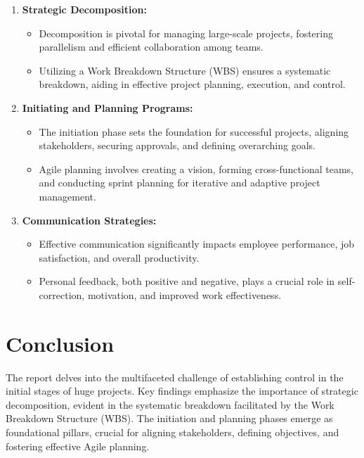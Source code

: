 \documentclass[runningheads]{llncs}
\begin{document}
\begin{enumerate}
    \item \textbf{Strategic Decomposition:}
        \begin{itemize}[label=$\bullet$]
            \item Decomposition is pivotal for managing large-scale projects, fostering parallelism and efficient collaboration among teams.
            \item Utilizing a Work Breakdown Structure (WBS) ensures a systematic breakdown, aiding in effective project planning, execution, and control.
        \end{itemize}


    \item \textbf{Initiating and Planning Programs:}
        \begin{itemize}[label=$\bullet$]
            \item The initiation phase sets the foundation for successful projects, aligning stakeholders, securing approvals, and defining overarching goals.
            \item Agile planning involves creating a vision, forming cross-functional teams, and conducting sprint planning for iterative and adaptive project management.
        \end{itemize}

    \item \textbf{Communication Strategies:}
        \begin{itemize}[label=$\bullet$]
            \item Effective communication significantly impacts employee performance, job satisfaction, and overall productivity.
            \item Personal feedback, both positive and negative, plays a crucial role in self-correction, motivation, and improved work effectiveness.
        \end{itemize}
\end{enumerate}

\section{Conclusion}
The report delves into the multifaceted challenge of establishing control in the initial stages of huge projects. Key findings emphasize the importance of strategic decomposition, evident in the systematic breakdown facilitated by the Work Breakdown Structure (WBS). The initiation and planning phases emerge as foundational pillars, crucial for aligning stakeholders, defining objectives, and fostering effective Agile planning.
\end{document}
